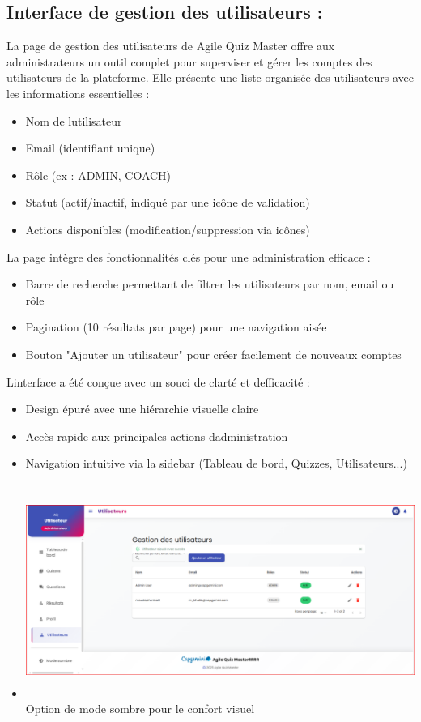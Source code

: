 \documentclass[12pt,a4paper,twoside,openright]{report}
\begin{document}
\hypertarget{interface-de-gestion-des-utilisateurs}{%
\subsection{Interface de gestion des utilisateurs
:}\label{interface-de-gestion-des-utilisateurs}}

La page de gestion des utilisateurs de Agile Quiz Master offre aux
administrateurs un outil complet pour superviser et gérer les comptes
des utilisateurs de la plateforme. Elle présente une liste organisée des
utilisateurs avec les informations essentielles :

\begin{itemize}
\item
  Nom de l\textquotesingle utilisateur
\item
  Email (identifiant unique)
\item
  Rôle (ex : ADMIN, COACH)
\item
  Statut (actif/inactif, indiqué par une icône de validation)
\item
  Actions disponibles (modification/suppression via icônes)
\end{itemize}

La page intègre des fonctionnalités clés pour une administration
efficace :

\begin{itemize}
\item
  Barre de recherche permettant de filtrer les utilisateurs par nom,
  email ou rôle
\item
  Pagination (10 résultats par page) pour une navigation aisée
\item
  Bouton "Ajouter un utilisateur" pour créer facilement de nouveaux
  comptes
\end{itemize}

L\textquotesingle interface a été conçue avec un souci de clarté et
d\textquotesingle efficacité :

\begin{itemize}
\item
  Design épuré avec une hiérarchie visuelle claire
\item
  Accès rapide aux principales actions d\textquotesingle administration
\item
  Navigation intuitive via la sidebar (Tableau de bord, Quizzes,
  Utilisateurs...)
\item
  \includegraphics[width=6.3in,height=2.75972in]{latex_media/media/image53.png}Option
  de mode sombre pour le confort visuel
\end{itemize}
\end{document}
